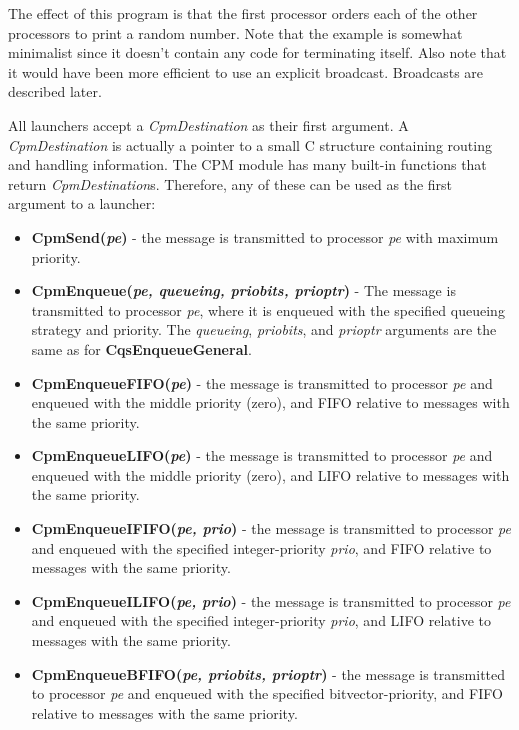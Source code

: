 The effect of this program is that the first processor orders each of
the other processors to print a random number.  Note that the example
is somewhat minimalist since it doesn't contain any code for
terminating itself.  Also note that it would have been more efficient
to use an explicit broadcast.  Broadcasts are described later.

All launchers accept a {\it CpmDestination} as their first argument.  A
{\it CpmDestination} is actually a pointer to a small C structure
containing routing and handling information.  The CPM module has many
built-in functions that return {\it CpmDestination}s.  Therefore, any
of these can be used as the first argument to a launcher:

\begin{itemize}

\item[]{{\bf CpmSend({\it pe})} - the message is transmitted to
processor {\it pe} with maximum priority}.

\item[]{{\bf CpmEnqueue({\it pe, queueing, priobits, prioptr})}
- The message is transmitted to processor {\it pe}, where it is
enqueued with the specified queueing strategy and priority.  The {\it
queueing}, {\it priobits}, and {\it prioptr} arguments are the same as
for {\bf CqsEnqueueGeneral}.}

\item[]{{\bf CpmEnqueueFIFO({\it pe})} - the message is transmitted to
processor {\it pe} and enqueued with the middle priority (zero), and
FIFO relative to messages with the same priority.}

\item[]{{\bf CpmEnqueueLIFO({\it pe})} - the message is transmitted to
processor {\it pe} and enqueued with the middle priority (zero), and
LIFO relative to messages with the same priority.}

\item[]{{\bf CpmEnqueueIFIFO({\it pe, prio})} - the message is
transmitted to processor {\it pe} and enqueued with the specified
integer-priority {\it prio}, and FIFO relative to messages with the
same priority.}

\item[]{{\bf CpmEnqueueILIFO({\it pe, prio})} - the message is
transmitted to processor {\it pe} and enqueued with the specified
integer-priority {\it prio}, and LIFO relative to messages with the
same priority.}

\item[]{{\bf CpmEnqueueBFIFO({\it pe, priobits, prioptr})} - the
message is transmitted to processor {\it pe} and enqueued with the
specified bitvector-priority, and FIFO relative to messages
with the same priority.}


\end{itemize}

